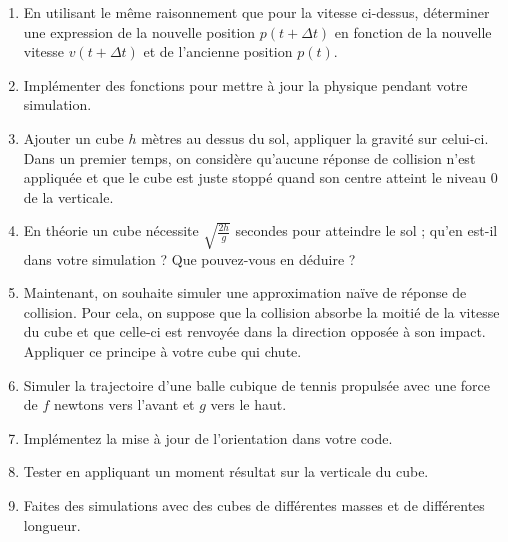 \documentclass[a4paper,12pt]{article}
\begin{document}
\begin{enumerate}
    \item En utilisant le même raisonnement que pour la vitesse ci-dessus, déterminer une expression de la nouvelle position $p(t+\Delta t)$ en fonction de la nouvelle vitesse $v(t+\Delta t)$ et de l'ancienne position $p(t)$.  
    \item Implémenter des fonctions pour mettre à jour la physique pendant votre simulation.
    \item Ajouter un cube $h$ mètres au dessus du sol, appliquer la gravité sur celui-ci. Dans un premier temps, on considère qu'aucune réponse de collision n'est appliquée et que le cube est juste stoppé quand son centre atteint le niveau $0$ de la verticale. 
    \item En théorie un cube nécessite $\sqrt{\tfrac{2h}{g}}$ secondes pour atteindre le sol ; qu'en est-il dans votre simulation ? Que pouvez-vous en déduire ?
    \item Maintenant, on souhaite simuler une approximation \og naïve \fg{} de réponse de collision. Pour cela, on suppose que la collision absorbe la moitié de la vitesse du cube et que celle-ci est renvoyée dans la direction opposée à son impact. Appliquer ce principe à votre cube qui chute.
    \item Simuler la trajectoire d'une balle cubique de tennis propulsée avec une force de $f$ newtons vers l'avant et $g$ vers le haut.
    \item Implémentez la mise à jour de l'orientation dans votre code.
    \item Tester en appliquant un moment résultat sur la verticale du cube. 
    \item Faites des simulations avec des cubes de différentes masses et de différentes longueur. 
\end{enumerate}
\end{document}
